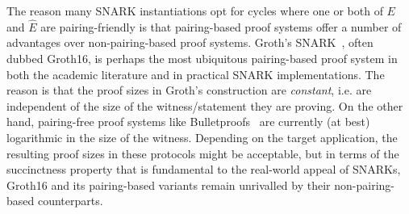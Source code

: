 \documentclass[version=preprint]{iacrcc}
\begin{document}
The reason many SNARK instantiations opt for cycles where one or both of $E$ and $\hat{E}$ are pairing-friendly is that pairing-based proof systems offer a number of advantages over non-pairing-based proof systems. Groth's SNARK~\cite{Groth16}, often dubbed {\sf Groth16}, is perhaps the most ubiquitous pairing-based proof system in both the academic literature and in practical SNARK implementations. The reason is that the proof sizes in Groth's construction are \emph{constant}, i.e. are independent of the size of the witness/statement they are proving. On the other hand, pairing-free proof systems like Bulletproofs~\cite{bulletproofs} are currently (at best) logarithmic in the size of the witness. Depending on the target application, the resulting proof sizes in these protocols might be acceptable, but in terms of the succinctness property that is fundamental to the real-world appeal of SNARKs, {\sf Groth16} and its pairing-based variants remain unrivalled by their non-pairing-based counterparts. 
\end{document}
